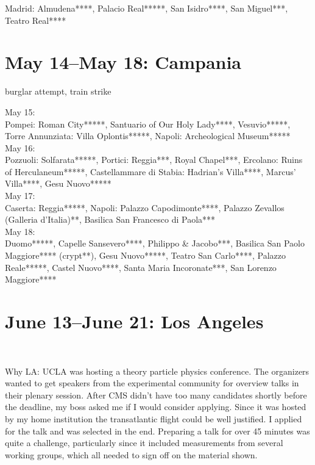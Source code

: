 Madrid:
Almudena****,
Palacio Real*****,
San Isidro****,
San Miguel***,
Teatro Real****\\

\section{May 14--May 18: Campania}
\label{2015:Campania}

burglar attempt, train strike

May 15: \\
Pompei: Roman City*****, Santuario of Our Holy Lady****, Vesuvio*****, Torre Annunziata: Villa Oplontis*****, Napoli: Archeological Museum*****\\

May 16:\\
Pozzuoli: Solfarata*****, Portici: Reggia***, Royal Chapel***, Ercolano: Ruins of Herculaneum*****, Castellammare di Stabia: Hadrian's Villa****, Marcus' Villa****, Gesu Nuovo*****\\

May 17:\\
Caserta: Reggia*****, Napoli: Palazzo Capodimonte****, Palazzo Zevallos (Galleria d'Italia)**, Basilica San Francesco di Paola***\\

May 18:\\
Duomo*****, Capelle Sansevero****, Philippo \& Jacobo***, Basilica San Paolo Maggiore**** (crypt**), Gesu Nuovo*****, Teatro San Carlo****, Palazzo Reale*****, Castel Nuovo****, Santa Maria Incoronate***, San Lorenzo Maggiore****

\section{June 13--June 21: Los Angeles}\
\label{LA2015}

Why LA: UCLA was hosting a theory particle physics conference. The organizers wanted to get speakers from the experimental community for overview talks in their plenary session. After CMS didn't have too many candidates shortly before the deadline, my boss asked me if I would consider applying. Since it was hosted by my home institution the transatlantic flight could be well justified. I applied for the talk and was selected in the end. Preparing a talk for over 45 minutes was quite a challenge, particularly since it included measurements from several working groups, which all needed to sign off on the material shown. \\

